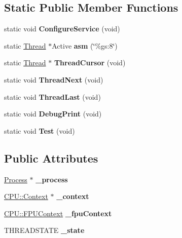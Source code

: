 \subsection*{Static Public Member Functions}
\begin{DoxyCompactItemize}
\item 
\mbox{\label{class_thread_ae3ce371d66bac1337ac5924dba453b49}} 
static void {\bfseries Configure\+Service} (void)
\item 
\mbox{\label{class_thread_a8c36c83c26333d0eeef1171a2a5218b1}} 
static \hyperlink{class_thread}{Thread} $\ast$Active {\bfseries asm} (\char`\"{}\%gs\+:8\char`\"{})
\item 
\mbox{\label{class_thread_a5c62d6365302d33273e9e83236a87a12}} 
static \hyperlink{class_thread}{Thread} $\ast$ {\bfseries Thread\+Cursor} (void)
\item 
\mbox{\label{class_thread_a202f41189b55c4c9aa7cff0cc223a53f}} 
static void {\bfseries Thread\+Next} (void)
\item 
\mbox{\label{class_thread_a6016630a737ed32dc4792616baa6ecfe}} 
static void {\bfseries Thread\+Last} (void)
\item 
\mbox{\label{class_thread_a8f7952a73a287b62135aa5d8f80fe9ee}} 
static void {\bfseries Debug\+Print} (void)
\item 
\mbox{\label{class_thread_a69bd399fcbae20d822317c731a831418}} 
static void {\bfseries Test} (void)
\end{DoxyCompactItemize}
\subsection*{Public Attributes}
\begin{DoxyCompactItemize}
\item 
\mbox{\label{class_thread_a70f18253f42d8ec53fe2947d47df991c}} 
\hyperlink{class_process}{Process} $\ast$ {\bfseries \+\_\+process}
\item 
\mbox{\label{class_thread_af9c6f91d13755d913734816af35ba220}} 
\hyperlink{class_c_p_u_1_1_context}{C\+P\+U\+::\+Context} $\ast$ {\bfseries \+\_\+context}
\item 
\mbox{\label{class_thread_a61eb8270e7b2717dd647e244dc35e39b}} 
\hyperlink{class_c_p_u_1_1_f_p_u_context}{C\+P\+U\+::\+F\+P\+U\+Context} {\bfseries \+\_\+fpu\+Context}
\item 
\mbox{\label{class_thread_a98bb87f94da7b526b4ed52d7679b6169}} 
T\+H\+R\+E\+A\+D\+S\+T\+A\+TE {\bfseries \+\_\+state}
\end{DoxyCompactItemize}
